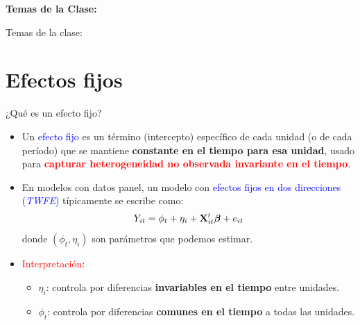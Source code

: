 \documentclass[10pt, xcolor=dvipsnames]{beamer}
\subtitle{Diferencias en Diferencias (DiD) II}
\begin{document}
	\beamertemplatenavigationsymbolsempty	
\begin{frame}[plain]%
	\titlepage
	\vspace{-0.4cm}
\textbf{Temas de la Clase:} \\ \vspace{0.3cm}
	\tableofcontents
\end{frame}

\begin{frame}{Temas de la clase:}
	\tableofcontents
\end{frame}


\section{Efectos fijos}

\begin{frame}{¿Qué es un efecto fijo?}
\begin{itemize}\setlength{\itemsep}{0.75em}
    \item Un \textcolor{blue}{efecto fijo} es un término (intercepto) específico de cada unidad (o de cada período) que se mantiene \textbf{constante en el tiempo para esa unidad}, usado para \textcolor{red}{\textbf{capturar heterogeneidad no observada invariante en el tiempo}}.
    \item En modelos con datos panel, un modelo con \textcolor{blue}{efectos fijos en dos direcciones (\textit{TWFE})} típicamente se escribe como:
	\begin{align*}
	   Y_{it} = \phi_t + \eta_{i} + \textbf{X}'_{it}\boldsymbol{\beta} + e_{it}
	\end{align*}
    donde \((\phi_t, \eta_{i})\) son parámetros que podemos estimar. %
    \item \textcolor{red}{Interpretación}:
    \begin{itemize}
        \item \(\eta_{i}\): controla por diferencias \textbf{invariables en el tiempo} entre unidades.
        \item \(\phi_t\): controla por diferencias \textbf{comunes en el tiempo} a todas las unidades.
    \end{itemize}
\end{itemize}
\end{frame}
\end{document}
